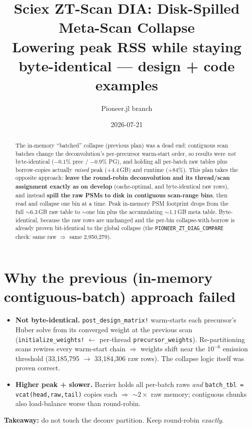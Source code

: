 \documentclass[11pt]{article}
\title{\textbf{Sciex ZT-Scan DIA: Disk-Spilled Meta-Scan Collapse}\\[2pt]\large Lowering peak RSS while staying byte-identical --- design + code examples}
\author{Pioneer.jl \quad branch \code{feat/zt-batched-collapse}}
\date{2026-07-21}
\newcommand{\code}[1]{\texttt{\small #1}}
\begin{document}
\maketitle

\begin{abstract}
The in-memory ``batched'' collapse (previous plan) was a dead end: contiguous scan batches
change the deconvolution's per-precursor warm-start order, so results were \emph{not}
byte-identical (\(-0.1\%\) prec / \(-0.9\%\) PG), and holding all per-batch raw tables plus
borrow-copies actually \emph{raised} peak (+4.4\,GB) and runtime (+84\%). This plan takes the
opposite approach: \textbf{leave the round-robin deconvolution and its thread/scan assignment
exactly as on develop} (cache-optimal, and byte-identical raw rows), and instead \textbf{spill
the raw PSMs to disk in contiguous scan-range bins}, then read and collapse one bin at a time.
Peak in-memory PSM footprint drops from the full \(\sim\)6.3\,GB raw table to \(\sim\)one bin
plus the accumulating \(\sim\)1.1\,GB meta table. Byte-identical, because the raw rows are
unchanged and the per-bin collapse-with-borrow is already proven bit-identical to the global
collapse (the \code{PIONEER\_ZT\_DIAG\_COMPARE} check: same raw \(\Rightarrow\) same 2{,}950{,}279).
\end{abstract}

\section{Why the previous (in-memory contiguous-batch) approach failed}
\begin{itemize}[nosep]
  \item \textbf{Not byte-identical.} \code{post\_design\_matrix!} warm-starts each precursor's
    Huber solve from its converged weight at the previous scan (\code{initialize\_weights!}
    \(\leftarrow\) per-thread \code{precursor\_weights}). Re-partitioning scans rewires every
    warm-start chain \(\Rightarrow\) weights shift near the \(10^{-6}\) emission threshold
    (33{,}185{,}795 \(\to\) 33{,}184{,}306 raw rows). The collapse logic itself was proven correct.
  \item \textbf{Higher peak + slower.} Barrier holds all per-batch raws \emph{and}
    \code{batch\_tbl = vcat(head,raw,tail)} copies each \(\Rightarrow\) \(\sim2\times\) raw
    memory; contiguous chunks also load-balance worse than round-robin.
\end{itemize}
\textbf{Takeaway:} do not touch the deconv partition. Keep round-robin \emph{exactly}.
\end{document}
